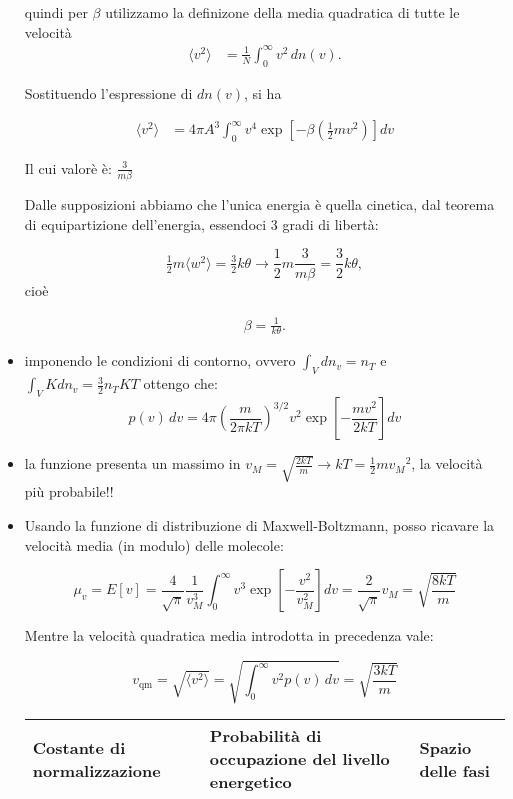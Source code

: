 \documentclass{article}
\begin{document}
\begin{itemize}
\begin{nota}
quindi per $\beta$ utilizzamo la definizone della media quadratica di tutte le velocità
\begin{align*}
    \langle v^2 \rangle &= \frac{1}{N} \int_0^\infty v^2 \, dn(v).
\end{align*}

Sostituendo l'espressione di \( dn(v) \), si ha

\begin{align*}
    \langle v^2 \rangle &= 4\pi A^3 \int_0^\infty v^4 \exp \left[ -\beta \left( \tfrac{1}{2} mv^2 \right) \right] dv
\end{align*}

Il cui valorè è:
$\frac{3}{m\beta}$

Dalle supposizioni abbiamo che l'unica energia è quella cinetica, dal teorema di equipartizione dell'energia, essendoci 3 gradi di libertà:

\[
    \tfrac{1}{2} m \langle w^2 \rangle = \tfrac{3}{2} k \theta \rightarrow \frac{1}{2} m \frac{3}{m\beta} = \frac{3}{2} k \theta,
\]
cioè

\begin{align*}
    \beta = \frac{1}{k \theta}.
\end{align*}
\end{nota} 
\item imponendo le condizioni di contorno, ovvero $\displaystyle \int_{V} dn_v=n_T$ e $\displaystyle \int_{V}K dn_v=\frac{3}{2}n_T K T$ ottengo che:
\[
p(v) \, dv = 4\pi \left( \frac{m}{2\pi kT} \right)^{3/2} v^2 \exp \left[ -\frac{mv^2}{2kT} \right] dv
\]
\item la funzione presenta un massimo in $v_M=\sqrt{\frac{2kT}{m}} \rightarrow kT= \frac{1}{2}m {v_M}^2$, la velocità più probabile!!
\item Usando la funzione di distribuzione di Maxwell-Boltzmann, posso ricavare la velocità media (in modulo) delle molecole:

\[
\mu_v = E[v] = \frac{4}{\sqrt{\pi}} \frac{1}{v_M^3} \int_0^\infty v^3 \exp\left[-\frac{v^2}{v_M^2}\right] dv = \frac{2}{\sqrt{\pi}} v_M = \sqrt{\frac{8kT}{m}}
\]

Mentre la velocità quadratica media introdotta in precedenza vale:

\[
v_{\text{qm}} = \sqrt{\langle v^2 \rangle} = \sqrt{\int_0^\infty v^2 p(v) \, dv} = \sqrt{\frac{3kT}{m}}
\]

\begin{tabular}{lll}
    \toprule
    Costante di normalizzazione & Probabilità di occupazione del livello energetico & Spazio delle fasi \\
    \midrule
    \end{tabular}


\end{itemize}
\end{document}

